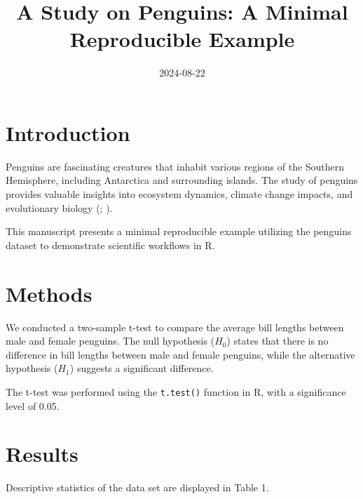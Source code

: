 \documentclass[
  man,
  longtable,
  nolmodern,
  notxfonts,
  notimes,
  colorlinks=true,linkcolor=blue,citecolor=blue,urlcolor=blue]{apa7}
\title{A Study on Penguins: A Minimal Reproducible Example}
\date{2024-08-22}
\begin{document}
\maketitle


\setcounter{secnumdepth}{-\maxdimen} %

\setlength\LTleft{0pt}


\section{Introduction}\label{introduction}

Penguins are fascinating creatures that inhabit various regions of the
Southern Hemisphere, including Antarctica and surrounding islands. The
study of penguins provides valuable insights into ecosystem dynamics,
climate change impacts, and evolutionary biology
(; ).

This manuscript presents a minimal reproducible example utilizing the
penguins dataset to demonstrate scientific workflows in R.

\section{Methods}\label{methods}

We conducted a two-sample t-test to compare the average bill lengths
between male and female penguins. The null hypothesis (\(H_0\)) states
that there is no difference in bill lengths between male and female
penguins, while the alternative hypothesis (\(H_1\)) suggests a
significant difference.

The t-test was performed using the \texttt{t.test()} function in R, with
a significance level of 0.05.

\section{Results}\label{results}

Descriptive statistics of the data set are displayed in Table 1.
\end{document}
